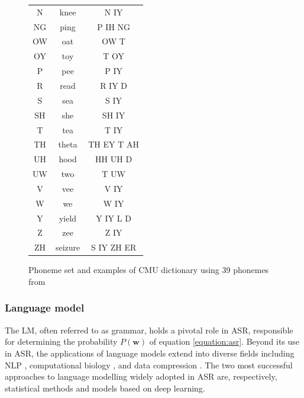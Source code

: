 \begin{figure}
\begin{minipage}[t]{0.5\textwidth}
\begin{tabular}{ccc}
            N & knee & N IY \\
            NG & ping & P IH NG \\
            OW & oat & OW T \\
            OY & toy & T OY \\
            P & pee & P IY \\
            R & read & R IY D \\
            S & sea & S IY \\
            SH & she & SH IY \\
            T & tea & T IY \\
            TH & theta & TH EY T AH \\
            UH & hood & HH UH D \\
            UW & two & T UW \\
            V & vee & V IY \\
            W & we & W IY \\
            Y & yield & Y IY L D \\
            Z & zee & Z IY \\
            ZH & seizure & S IY ZH ER \\
            \hline
        \end{tabular}
    \end{minipage}
    \caption{Phoneme set and examples of CMU dictionary using 39 phonemes from \cite{weide1998carnegie}}
    \label{CMU_DICT}
\end{figure}


\subsubsection{Language model}%
The \ac{LM}, often referred to as grammar, holds a pivotal role in \ac{ASR}, responsible for determining the probability $P(\boldsymbol{w})$ of equation \ref{equation:asr}. Beyond its use in \ac{ASR}, the applications of language models extend into diverse fields including \ac{NLP} \cite{n-grams-NLP}, computational biology  \cite{n-grams-computational_biology}, and data compression \cite{n-gram-compression}. The two most successful approaches to language modelling widely adopted in \ac{ASR} are, respectively, statistical methods and models based on deep learning. 


